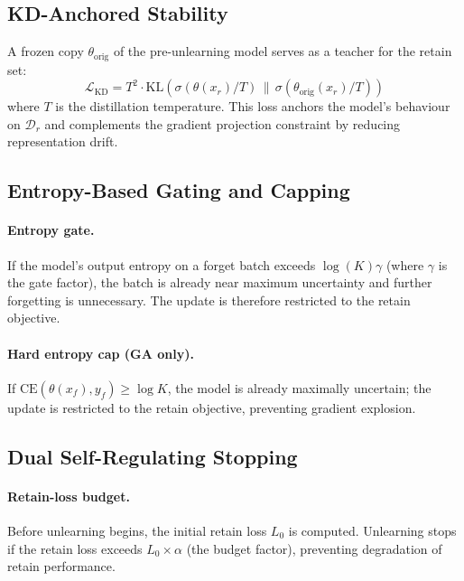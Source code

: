 \documentclass{article}
\begin{document}
\subsection{KD-Anchored Stability}\label{sec:kd_anchor}

A frozen copy $\theta_{\text{orig}}$ of the pre-unlearning model serves as a teacher for the retain set:
\begin{equation}
\mathcal{L}_{\text{KD}} = T^2 \cdot \text{KL}\!\left(\sigma(\theta(x_r)/T) \,\|\, \sigma(\theta_{\text{orig}}(x_r)/T)\right)
\end{equation}
where $T$ is the distillation temperature.
This loss anchors the model's behaviour on $\mathcal{D}_r$ and complements the gradient projection constraint by reducing representation drift.

\subsection{Entropy-Based Gating and Capping}

\paragraph{Entropy gate.}
If the model's output entropy on a forget batch exceeds $\log(K)\gamma$ (where $\gamma$ is the gate factor), the batch is already near maximum uncertainty and further forgetting is unnecessary.
The update is therefore restricted to the retain objective.

\paragraph{Hard entropy cap (GA only).}
If $\text{CE}(\theta(x_f), y_f) \geq \log K$, the model is already maximally uncertain; the update is restricted to the retain objective, preventing gradient explosion.

\subsection{Dual Self-Regulating Stopping}\label{sec:stopping}

\paragraph{Retain-loss budget.}
Before unlearning begins, the initial retain loss $L_0$ is computed.
Unlearning stops if the retain loss exceeds $L_0 \times \alpha$ (the budget factor), preventing degradation of retain performance.
\end{document}
